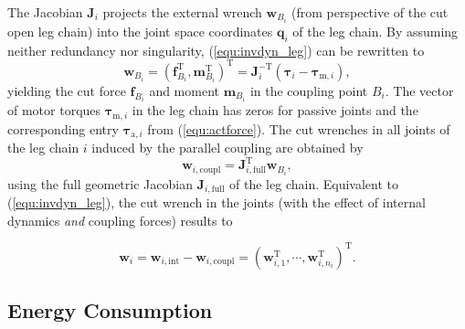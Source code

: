 \documentclass[fleqn,a4paper,10pt]{article}
\newcommand{\bm}[1]{\mathbf{#1}}
\newcommand{\transp}[0]{{\mathrm{T}}}
\begin{document}
\begin{multicols}{2}
%
The Jacobian $\bm{J}_{i}$ projects the external wrench $\bm{w}_{B_i}$ (from perspective of the cut open leg chain) into the joint space coordinates $\bm{q}_i$ of the leg chain.
By assuming neither redundancy nor singularity, (\ref{equ:invdyn_leg}) can be rewritten to
%
\begin{equation}
\bm{w}_{B_i}
=
(\bm{f}_{B_i}^\transp, \bm{m}_{B_i}^\transp)^\transp
=
\bm{J}_{i}^{-\transp} (\bm{\tau}_{i} - \bm{\tau}_{\mathrm{m},i}),
\label{equ:coupling_wrench_leg}
\end{equation}
%
yielding the cut force $\bm{f}_{B_i}$ and moment $\bm{m}_{B_i}$ in the coupling point $B_i$.
The vector of motor torques $\bm{\tau}_{\mathrm{m},i}$ in the leg chain has zeros for passive joints and the corresponding entry $\bm{\tau}_{\mathrm{a},i}$ from (\ref{equ:actforce}).
The cut wrenches in all joints of the leg chain $i$ induced by the parallel coupling are obtained by
%
\begin{equation}
\bm{w}_{i,\mathrm{coupl}}=\bm{J}_{i,\mathrm{full}}^{\transp} \bm{w}_{B_i},
\label{equ:intforce_fromcoupling}
\end{equation}
%
using the full geometric Jacobian $\bm{J}_{i,\mathrm{full}}$ of the leg chain.
Equivalent to (\ref{equ:invdyn_leg}), the cut wrench in the joints (with the effect of internal dynamics \emph{and} coupling forces) results to

\begin{equation}
\bm{w}_{i} 
= 
\bm{w}_{i,\mathrm{int}} - \bm{w}_{i,\mathrm{coupl}}
=
(\bm{w}_{i,1}^\transp,\cdots,\bm{w}_{i,n_i}^\transp)^\transp.
\label{equ:intforce_total}
\end{equation}

\subsection{Energy Consumption}
\label{sec:energy}


\end{multicols}
\end{document}
